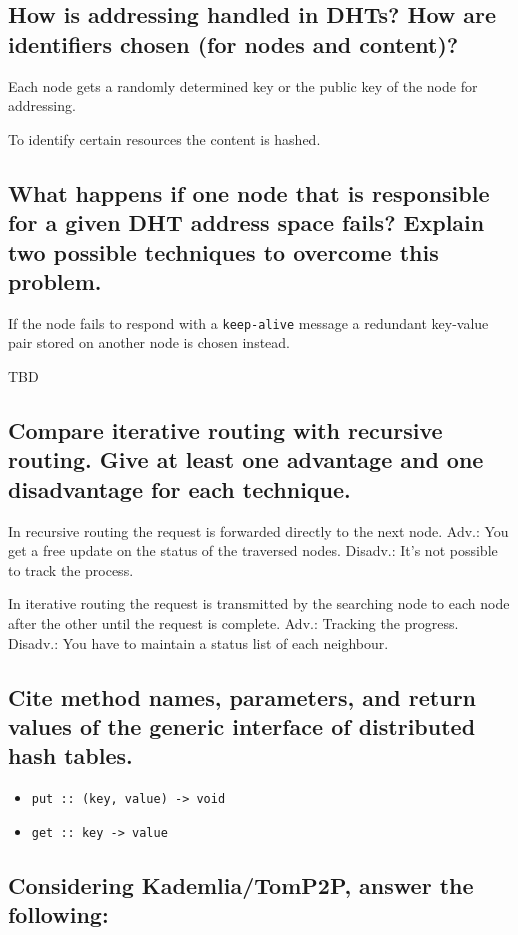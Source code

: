 \documentclass{article}
\begin{document}
\subsection{How is addressing handled in DHTs? How are identifiers chosen (for
nodes and content)?}

Each node gets a randomly determined key or the public key of the node for
addressing.

To identify certain resources the content is hashed.

\subsection{What happens if one node that is responsible for a given DHT address
space fails? Explain two possible techniques to overcome this problem.}

If the node fails to respond with a \lstinline{keep-alive} message a redundant
key-value pair stored on another node is chosen instead.

TBD

\subsection{Compare iterative routing with recursive routing. Give at least one
advantage and one disadvantage for each technique.}

In recursive routing the request is forwarded directly to the next node.
Adv.: You get a free update on the status of the traversed nodes.
Disadv.: It's not possible to track the process.

In iterative routing the request is transmitted by the searching node to each
node after the other until the request is complete.
Adv.: Tracking the progress.
Disadv.: You have to maintain a status list of each neighbour.

\subsection{Cite method names, parameters, and return values of the generic
interface of distributed hash tables.}

\begin{itemize}
  \item \lstinline{put :: (key, value) -> void}
  \item \lstinline{get :: key -> value}
\end{itemize}

\subsection{Considering Kademlia/TomP2P, answer the following:}
\end{document}
